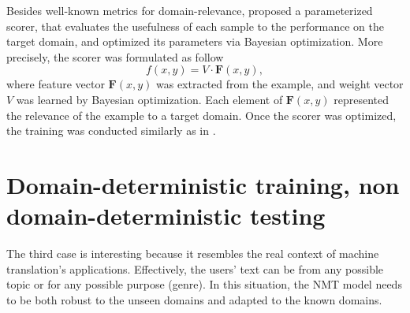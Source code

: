 Besides well-known metrics for domain-relevance, \citet{Zhang19curriculum} proposed a parameterized scorer, that evaluates the usefulness of each sample to the performance on the target domain, and optimized its parameters via Bayesian optimization. More precisely, the scorer was formulated as follow
\begin{equation}
\mathit{f}(x,y) = V \cdot \mathbf{F}(x,y),
\end{equation}
where feature vector $\mathbf{F}(x,y)$ was extracted from the example, and weight vector $V$ was learned by Bayesian optimization. Each element of $\mathbf{F}(x,y)$ represented the relevance of the example to a target domain. Once the scorer was optimized, the training was conducted similarly as in \citet{Wees17dynamic,Wang19dynamically}.

\section{Domain-deterministic training, non domain-deterministic testing}
\label{sec:case3}
The third case is interesting because it resembles the real context of machine translation's applications. Effectively, the users' text can be from any possible topic or for any possible purpose (genre). In this situation, the NMT model needs to be both robust to the unseen domains and adapted to the known domains. 
